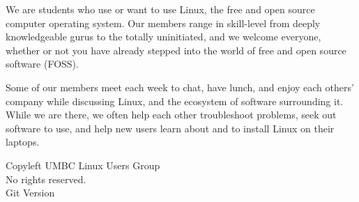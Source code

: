 \documentclass[11pt]{article}
\newcommand{\foss}{FOSS}
\begin{document}
\begin{multicols*}{2}
We are students who use or want to use Linux, the free and open source computer
operating system. Our members range in skill-level from deeply knowledgeable
gurus to the totally uninitiated, and we welcome everyone, whether or not you
have already stepped into the world of free and open source software (\foss).

Some of our members meet each week to chat, have lunch, and enjoy each others'
company while discussing Linux, and the ecosystem of software surrounding it.
While we are there, we often help each other troubleshoot problems, seek out
software to use, and help new users learn about and to install Linux on their
laptops.

\vfill
\phantom{x}
\columnbreak{}

\lipsum[1-4]

\phantom{x}
\vfill
\begin{center} \tiny
    \textcopyleft{} Copyleft \the\year{} UMBC Linux Users Group \\
    No rights reserved. \\
    Git Version 
\end{center}
\end{multicols*}
\end{document}
